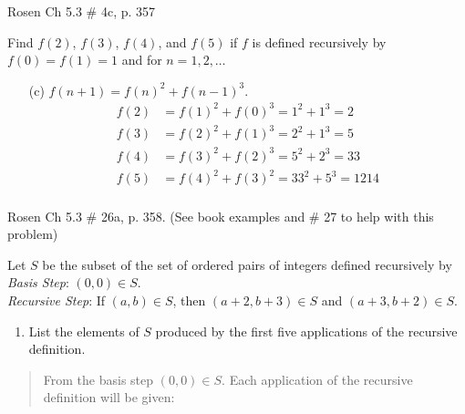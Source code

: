 \documentclass[12pt,addpoints]{exam}
\begin{document}
\begin{questions}
\question[4] Rosen Ch 5.3 \# 4c, p. 357
    \ifprintanswers
        \vspace{-10pt}
   \fi
\begin{solution}
Find $f(2)$, $f(3)$, $f(4)$, and $f(5)$ if $f$ is defined
recursively by $f(0) = f(1) = 1$ and for $n=1,2,\ldots$
\begin{itemize}
    \item[(c)] $f(n+1) = f(n)^2 + f(n-1)^3$.
    \begin{align*}
        f(2) &= f(1)^2 + f(0)^3 = 1^2 + 1^3 = 2 \\
        f(3) &= f(2)^2 + f(1)^3 = 2^2 + 1^3 = 5 \\
        f(4) &= f(3)^2 + f(2)^3 = 5^2 + 2^3 = 33 \\
        f(5) &= f(4)^2 + f(3)^2 = 33^2 + 5^3 = 1214 \\
    \end{align*}
\end{itemize}
\end{solution}


\question[6] Rosen Ch 5.3 \# 26a, p. 358. (See book examples and \#
27 to help with this problem)
\begin{solution}
Let $S$ be the subset of the set of ordered pairs of integers defined recursively by \\
\textit{Basis Step}: $(0,0) \in S$. \\
\textit{Recursive Step}: If $(a,b) \in S$, then $(a+2,b+3)\in S$ and $(a+3,b+2) \in S$. \\
\begin{enumerate}
    \item List the elements of $S$ produced by the first five applications of the recursive definition.
\end{enumerate}
\begin{quote}
    From the basis step $(0,0) \in S$.  Each application of the recursive definition will be given:


\end{quote}
\end{solution}
\end{questions}
\end{document}
